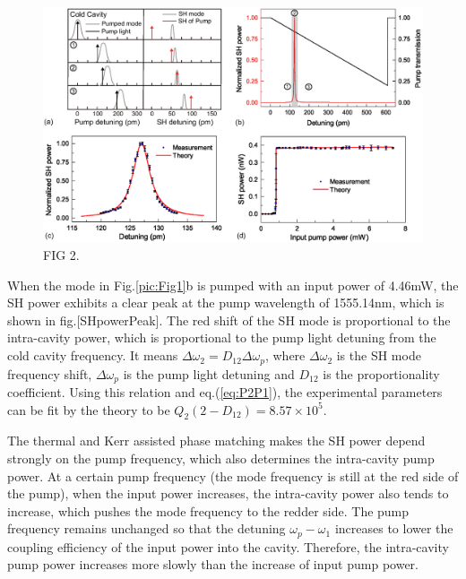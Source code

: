\documentclass[a4paper,8pt,hyperref, twocolumn]{article}
\begin{document}
\begin{figure}[!ht]
\centering
\includegraphics[width=18cm]{try_ed3.eps}
\caption{FIG 2.}
\label{pic:Fig2}
\end{figure}

When the mode in Fig.\ref{pic:Fig1}b is pumped with an input power of 4.46mW, the SH power exhibits a clear peak at the pump wavelength of 1555.14nm, which is shown in fig.[SHpowerPeak]. The red shift of the SH mode is proportional to the intra-cavity power, which is proportional to the pump light detuning from the cold cavity frequency. It means $\Delta \omega_2 = D_{12}\Delta \omega_p$, where $\Delta \omega_2$ is the SH mode frequency shift, $\Delta \omega_p$ is the pump light detuning and $D_{12}$ is the proportionality coefficient.  Using this relation and eq.(\ref{eq:P2P1}), the experimental parameters can be fit by the theory to be $Q_2(2-D_{12})=8.57\times 10^5$.

The thermal and Kerr assisted phase matching makes the SH power depend strongly on the pump frequency, which also determines the intra-cavity pump power. At a certain pump frequency (the mode frequency is still at the red side of the pump), when the input power increases, the intra-cavity power also tends to increase, which pushes the mode frequency to the redder side. The pump frequency remains unchanged so that the detuning $\omega_p-\omega_1$ increases to lower the coupling efficiency of the input power into the cavity. Therefore, the intra-cavity pump power increases more slowly than the increase of input pump power. 
\end{document}
